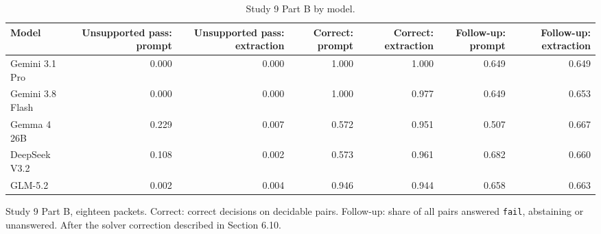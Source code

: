 \documentclass[10pt,twocolumn]{article}
\begin{document}
\begin{table}[t]
\centering\footnotesize\setlength{\tabcolsep}{4pt}
\caption{Study 9 Part B by model.}
\label{tab:27}
\begin{adjustbox}{max width=\textwidth}
\begin{tabular}{lrrrrrr}
\toprule
\textbf{Model} & \textbf{Unsupported pass: prompt} & \textbf{Unsupported pass: extraction} & \textbf{Correct: prompt} & \textbf{Correct: extraction} & \textbf{Follow-up: prompt} & \textbf{Follow-up: extraction} \\
\midrule
Gemini 3.1 Pro & 0.000 & 0.000 & 1.000 & 1.000 & 0.649 & 0.649 \\
Gemini 3.8 Flash & 0.000 & 0.000 & 1.000 & 0.977 & 0.649 & 0.653 \\
Gemma 4 26B & 0.229 & 0.007 & 0.572 & 0.951 & 0.507 & 0.667 \\
DeepSeek V3.2 & 0.108 & 0.002 & 0.573 & 0.961 & 0.682 & 0.660 \\
GLM-5.2 & 0.002 & 0.004 & 0.946 & 0.944 & 0.658 & 0.663 \\
\bottomrule
\end{tabular}
\end{adjustbox}
\par\vspace{3pt}\begin{minipage}{\textwidth}\scriptsize Study 9 Part B, eighteen packets. Correct: correct decisions on decidable pairs. Follow-up: share of all pairs answered \texttt{fail}, abstaining or unanswered. After the solver correction described in Section 6.10.\end{minipage}
\end{table}
\end{document}
